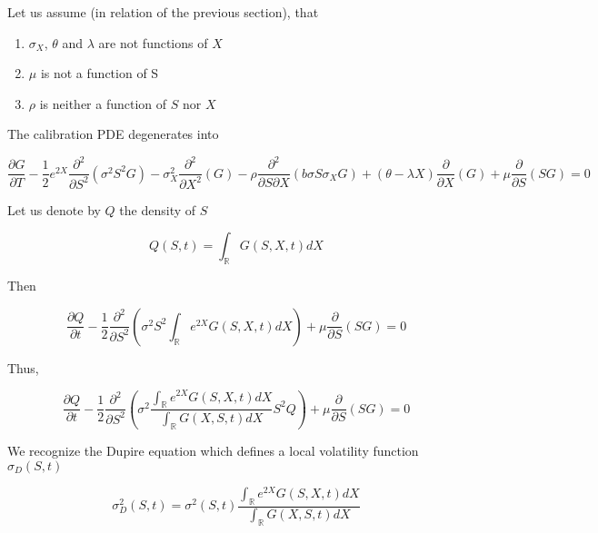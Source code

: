 \documentclass{article}
\begin{document}
\noindent Let us assume (in relation of the previous section), that 
\begin{enumerate}
	\item $\sigma_X$, $\theta$ and $\lambda$ are not functions of $X$
	\item $\mu$ is not a function of S
	\item $\rho$ is neither a function of $S$ nor $X$
\end{enumerate}

\noindent The calibration PDE degenerates into 

\begin{equation}
	\frac{\partial G}{\partial T} 
- \frac{1}{2} e^{2X }\frac{\partial^2}{\partial S^2} \left(\sigma^2 S^2 G\right) 
- \sigma_X^2 \frac{\partial^2}{\partial X^2} \left( G\right) 
- \rho \frac{\partial^2}{\partial S \partial X} \left(b \sigma S \sigma_X G \right) 
+ \left(\theta - \lambda X\right) \frac{\partial }{\partial X}\left( G\right) 
+ \mu \frac{\partial }{\partial S}(S G)
 = 0
\end{equation}

\noindent Let us denote by $Q$ the density of $S$

\begin{equation}
	Q(S,t) = \int_\mathbb{R} G(S,X,t) dX
\end{equation}

\noindent Then

\begin{equation}
	\frac{\partial Q}{\partial t} - \frac{1}{2} \frac{\partial^2}{\partial S^2} \left(\sigma^2 S^2 \int_\mathbb{R} e^{2X} G(S,X,t) dX \right) + \mu \frac{\partial }{\partial S}(S G) = 0
\end{equation}

\noindent Thus,

\begin{equation}
	\frac{\partial Q}{\partial t} - \frac{1}{2} \frac{\partial^2}{\partial S^2} \left(\sigma^2  \frac{\int_\mathbb{R} e^{2X} G(S,X,t) dX}{\int_\mathbb{R} G(X,S,t) dX}S^2Q\right) + \mu \frac{\partial }{\partial S}(S G) = 0
\end{equation}

\noindent We recognize the Dupire equation which defines a local volatility function $\sigma_D(S,t)$

\begin{equation}
	\sigma_D^2(S,t) = \sigma^2(S,t) \frac{\int_\mathbb{R} e^{2X} G(S,X,t) dX}{\int_\mathbb{R} G(X,S,t) dX}
\end{equation}
\end{document}
